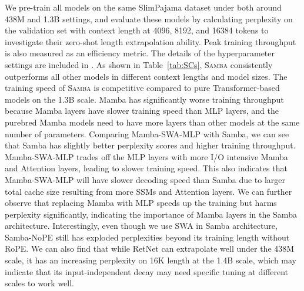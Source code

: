 \documentclass{article}
\begin{document}




We pre-train all models on the same SlimPajama \citep{slimpajama} dataset under both around 438M and 1.3B settings, and evaluate these models by calculating perplexity on the validation set with context length at 4096, 8192, and 16384 tokens to investigate their zero-shot length extrapolation ability. Peak training throughput is also measured as an efficiency metric. The details of the hyperparameter settings are included in .
As shown in Table~\ref{tab:SCs}, \textsc{Samba} consistently outperforms all other models in different context lengths and model sizes. 
The training speed of \textsc{Samba} is competitive compared to pure Transformer-based models on the 1.3B scale. Mamba has significantly worse training throughput because Mamba layers have slower training speed than MLP layers, and the purebred Mamba models need to have more layers than other models at the same number of parameters. Comparing Mamba-SWA-MLP with Samba, we can see that Samba has slightly better perplexity scores and higher training throughput. Mamba-SWA-MLP trades off the MLP layers with more I/O intensive Mamba and Attention layers, leading to slower training speed. This also indicates that Mamba-SWA-MLP will have slower decoding speed than Samba due to larger total cache size resulting from more SSMs and Attention layers. We can further observe that replacing Mamba with MLP speeds up the training but harms perplexity significantly, indicating the importance of Mamba layers in the Samba architecture. Interestingly, even though we use SWA in Samba architecture, Samba-NoPE still has exploded perplexities beyond its training length without RoPE. 
We can also find that while RetNet can extrapolate well under the 438M scale, it has an increasing perplexity on 16K length at the 1.4B scale, which may indicate that its input-independent decay may need specific tuning at different scales to work well.
\end{document}
